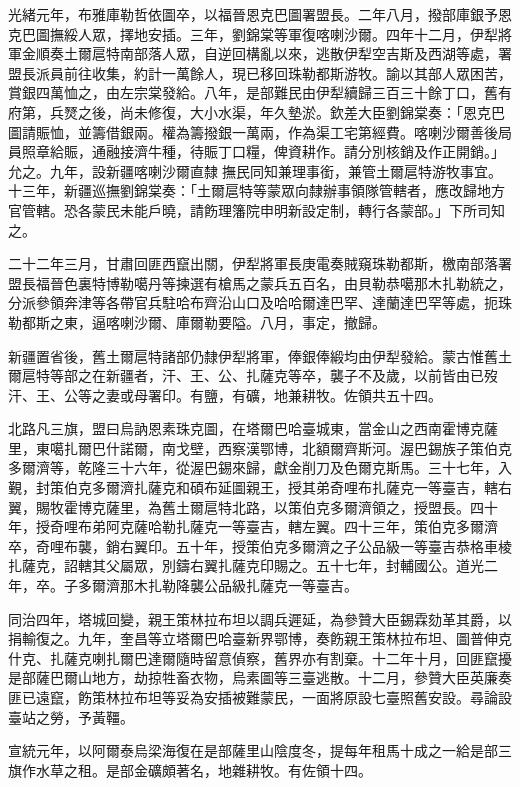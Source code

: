 \begin{pinyinscope}
光緒元年，布雅庫勒哲依圖卒，以福晉恩克巴圖署盟長。二年八月，撥部庫銀予恩克巴圖撫綏人眾，擇地安插。三年，劉錦棠等軍復喀喇沙爾。四年十二月，伊犁將軍金順奏土爾扈特南部落人眾，自逆回構亂以來，逃散伊犁空吉斯及西湖等處，署盟長派員前往收集，約計一萬餘人，現已移回珠勒都斯游牧。諭以其部人眾困苦，賞銀四萬恤之，由左宗棠發給。八年，是部難民由伊犁續歸三百三十餘丁口，舊有府第，兵燹之後，尚未修復，大小水渠，年久墊淤。欽差大臣劉錦棠奏：「恩克巴圖請賑恤，並籌借銀兩。權為籌撥銀一萬兩，作為渠工宅第經費。喀喇沙爾善後局員照章給賑，通融接濟牛種，待賑丁口糧，俾資耕作。請分別核銷及作正開銷。」允之。九年，設新疆喀喇沙爾直隸撫民同知兼理事銜，兼管土爾扈特游牧事宜。十三年，新疆巡撫劉錦棠奏：「土爾扈特等蒙眾向隸辦事領隊管轄者，應改歸地方官管轄。恐各蒙民未能戶曉，請飭理籓院申明新設定制，轉行各蒙部。」下所司知之。

二十二年三月，甘肅回匪西竄出關，伊犁將軍長庚電奏賊窺珠勒都斯，檄南部落署盟長福晉色裏特博勒噶丹等揀選有槍馬之蒙兵五百名，由貝勒恭噶那木扎勒統之，分派參領奔津等各帶官兵駐哈布齊沿山口及哈哈爾達巴罕、達蘭達巴罕等處，扼珠勒都斯之東，逼喀喇沙爾、庫爾勒要隘。八月，事定，撤歸。

新疆置省後，舊土爾扈特諸部仍隸伊犁將軍，俸銀俸緞均由伊犁發給。蒙古惟舊土爾扈特等部之在新疆者，汗、王、公、扎薩克等卒，襲子不及歲，以前皆由已歿汗、王、公等之妻或母署印。有鹽，有礦，地兼耕牧。佐領共五十四。

北路凡三旗，盟曰烏訥恩素珠克圖，在塔爾巴哈臺城東，當金山之西南霍博克薩里，東噶扎爾巴什諾爾，南戈壁，西察漢鄂博，北額爾齊斯河。渥巴錫族子策伯克多爾濟等，乾隆三十六年，從渥巴錫來歸，獻金削刀及色爾克斯馬。三十七年，入覲，封策伯克多爾濟扎薩克和碩布延圖親王，授其弟奇哩布扎薩克一等臺吉，轄右翼，賜牧霍博克薩里，為舊土爾扈特北路，以策伯克多爾濟領之，授盟長。四十年，授奇哩布弟阿克薩哈勒扎薩克一等臺吉，轄左翼。四十三年，策伯克多爾濟卒，奇哩布襲，銷右翼印。五十年，授策伯克多爾濟之子公品級一等臺吉恭格車棱扎薩克，詔轄其父屬眾，別鑄右翼扎薩克印賜之。五十七年，封輔國公。道光二年，卒。子多爾濟那木扎勒降襲公品級扎薩克一等臺吉。

同治四年，塔城回變，親王策林拉布坦以調兵遲延，為參贊大臣錫霖劾革其爵，以捐輸復之。九年，奎昌等立塔爾巴哈臺新界鄂博，奏飭親王策林拉布坦、圖普伸克什克、扎薩克喇扎爾巴達爾隨時留意偵察，舊界亦有割棄。十二年十月，回匪竄擾是部薩巴爾山地方，劫掠牲畜衣物，烏素圖等三臺逃散。十二月，參贊大臣英廉奏匪已遠竄，飭策林拉布坦等妥為安插被難蒙民，一面將原設七臺照舊安設。尋論設臺站之勞，予黃韁。

宣統元年，以阿爾泰烏梁海復在是部薩里山陰度冬，提每年租馬十成之一給是部三旗作水草之租。是部金礦頗著名，地雜耕牧。有佐領十四。


\end{pinyinscope}
